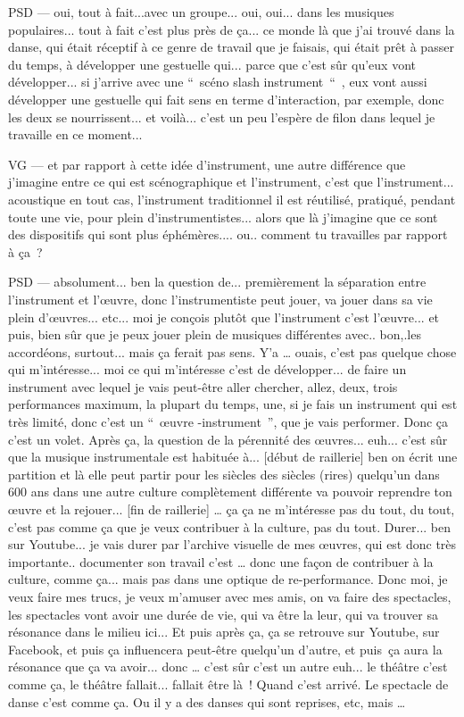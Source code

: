 PSD — oui, tout à fait...avec un groupe... oui, oui... dans les musiques populaires... tout à fait c'est plus près de ça... ce monde là que j'ai trouvé dans la danse, qui était réceptif à ce genre de travail que je faisais, qui était prêt à passer du temps, à développer une gestuelle qui... parce que c'est sûr qu'eux vont développer... si j'arrive avec une “ scéno slash instrument “ , eux vont aussi développer une gestuelle qui fait sens en terme d'interaction, par exemple, donc les deux se nourrissent... et voilà... c'est un peu l'espère de filon dans lequel je travaille en ce moment... 

VG — et par rapport à cette idée d'instrument, une autre différence que j'imagine entre ce qui est scénographique et l'instrument, c'est que l'instrument... acoustique en tout cas, l'instrument traditionnel il est réutilisé, pratiqué, pendant toute une vie, pour plein d'instrumentistes... alors que là j'imagine que ce sont des dispositifs qui sont plus éphémères.... ou.. comment tu travailles par rapport à ça ? 

PSD — absolument... ben la question de... premièrement la séparation entre l'instrument et l'œuvre, donc l'instrumentiste peut jouer, va jouer dans sa vie plein d'œuvres... etc...  moi je conçois plutôt que l'instrument c'est l'œuvre... et puis, bien sûr que je peux jouer plein de musiques différentes avec.. bon,.les accordéons, surtout... mais ça ferait pas sens. Y'a … ouais, c'est pas quelque chose qui m'intéresse... moi ce qui m'intéresse c'est de développer... de faire un instrument avec lequel je vais peut-être aller chercher, allez, deux, trois performances maximum, la plupart du temps, une, si je fais un instrument qui est très limité, donc c'est un “ œuvre -instrument ”, que je vais performer. Donc ça c'est un volet. Après ça, la question de la pérennité des œuvres... euh... c'est sûr que la musique instrumentale est habituée à... [début de raillerie] ben on écrit une partition et là elle peut partir pour les siècles des siècles (rires)  quelqu'un dans 600 ans dans une autre culture complètement différente va pouvoir reprendre ton œuvre et la rejouer... [fin de raillerie] … ça ça ne m'intéresse pas du tout, du tout, c'est pas comme ça que je veux contribuer à la culture, pas du tout. Durer... ben sur Youtube... je vais durer par l'archive visuelle de mes œuvres, qui est donc très importante.. documenter son travail c'est … donc une façon de contribuer à la culture, comme ça... mais pas dans une optique de re-performance. Donc moi, je veux faire mes trucs, je veux m'amuser avec mes amis, on va faire des spectacles, les spectacles vont avoir une durée de vie, qui va être la leur, qui va trouver sa résonance dans le milieu ici... Et puis après ça, ça se retrouve sur Youtube, sur Facebook, et puis ça influencera peut-être quelqu'un d'autre, et puis ça aura la résonance que ça va avoir... donc … c'est sûr c'est un autre euh... le théâtre c'est comme ça, le théâtre fallait... fallait être là ! Quand c'est arrivé. Le spectacle de danse c'est comme ça. Ou il y a des danses qui sont reprises, etc, mais … 

